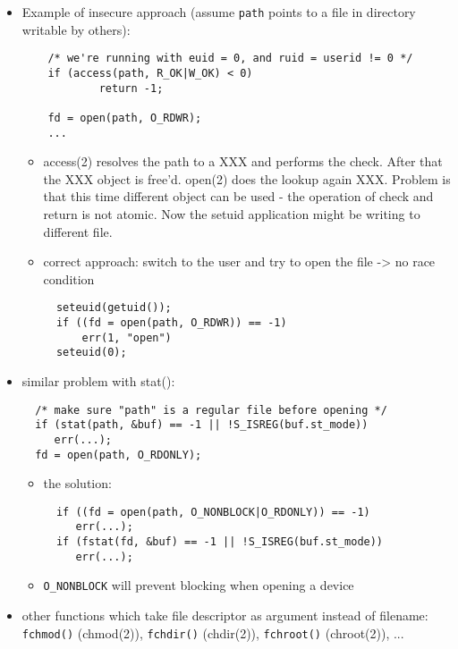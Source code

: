 \begin{itemize}
  \item Example of insecure approach (assume \texttt{path} points to a
  file in directory writable by others):
\begin{verbatim}
    /* we're running with euid = 0, and ruid = userid != 0 */
    if (access(path, R_OK|W_OK) < 0)
            return -1;

    fd = open(path, O_RDWR);
    ...
\end{verbatim}
  \begin{itemize}
  \item access(2) resolves the path to a XXX and performs the check. After
    that the XXX object is free'd. open(2) does the lookup again XXX.
    Problem is that this time different object can be used - the operation
    of check and return is not atomic. Now the setuid application might be
    writing to different file.
  \item correct approach: switch to the user and try to open the file -> no
    race condition
\begin{verbatim}
  seteuid(getuid());
  if ((fd = open(path, O_RDWR)) == -1)
      err(1, "open")
  seteuid(0);
\end{verbatim}
  \end{itemize}
  \item similar problem with stat():
\begin{verbatim}
  /* make sure "path" is a regular file before opening */
  if (stat(path, &buf) == -1 || !S_ISREG(buf.st_mode))
     err(...);
  fd = open(path, O_RDONLY);
\end{verbatim}
  \begin{itemize}
  \item the solution:
\begin{verbatim}
  if ((fd = open(path, O_NONBLOCK|O_RDONLY)) == -1)
     err(...);
  if (fstat(fd, &buf) == -1 || !S_ISREG(buf.st_mode))
     err(...);
\end{verbatim}
  \end{itemize}
  \begin{itemize}
  \item \texttt{O\_NONBLOCK} will prevent blocking when opening a device
  \end{itemize}
\item other functions which take file descriptor as argument instead of
  filename: \texttt{fchmod()} (chmod(2)), \texttt{fchdir()} (chdir(2)),
            \texttt{fchroot()} (chroot(2)), ...
\end{itemize}


